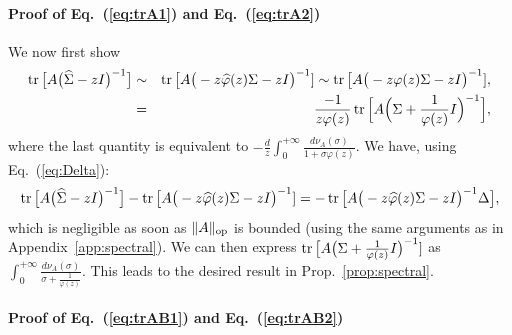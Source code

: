 \documentclass[11pt]{article}
\newcommand{\BEAS}{\begin{eqnarray*}}
\newcommand{\EEAS}{\end{eqnarray*}}
\newcommand{\tr}{\mathop{ \rm tr}}
\newcommand{\idm}{I}
\newcommand{\eq}[1]{Eq.~(\ref{eq:#1})}
\def \hphi{ \widehat{\varphi} }
\def \hS{ \widehat{ \Sigma} }
\def \S{  { \Sigma} }
\begin{document}
\paragraph{Proof of \eq{trA1} and \eq{trA2}}
We now first show
  \BEAS
\tr \big[ A \big( \hS -  z\idm \big)^{-1} \big] 
& \sim & \tr \big[ A \big( - z \hphi(z) \S - z \idm \big)^{-1} ]
\sim   \tr \big[ A \big( - z \varphi(z) \S - z \idm \big)^{-1} ],
\\
& = &    \frac{-1}{z \varphi(z)} \tr \Big[ A \Big(  \S + \frac{1}{\varphi(z)} \idm \Big)^{-1}\Big],
\EEAS
where the last quantity is equivalent to  $  -\frac{d}{z} \int_0^{+\infty} \frac{  d\nu_A(\sigma)}{1 + \sigma \varphi(z)}$.
We have,  using \eq{Delta}:
$$
  \tr \big[ A \big( \hS -  z\idm \big)^{-1} \big] 
-  \tr \big[ A \big( - z \hphi(z) \S - z \idm \big)^{-1} ] 
= - \tr \big[ A   \big( - z \hphi(z) \S - z \idm \big)^{-1} \Delta \big],
$$
  which is negligible as soon as $\| A\|_{\rm op}$ is bounded (using the same arguments as in Appendix~\ref{app:spectral}). We can then express 
  $\tr \big[ A \big( \S +\frac{1}{\varphi(z)} \idm \big)^{-1} ]$ as $  \int_0^{+\infty} \frac{ d\nu_A(\sigma)}{\sigma + \frac{1}{\varphi(z)} }$. This 
   leads to the desired result in Prop.~\ref{prop:spectral}.
  
  \paragraph{Proof of \eq{trAB1} and \eq{trAB2}}
\end{document}
